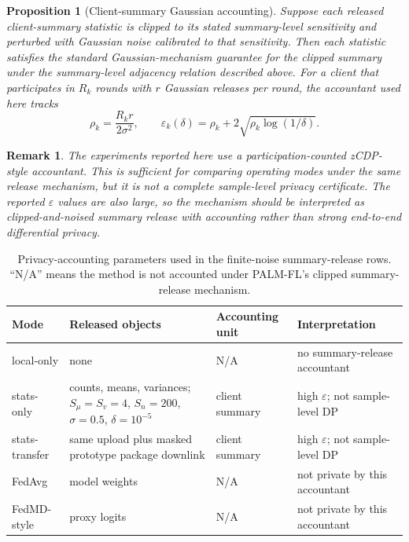 \documentclass[10pt,journal]{IEEEtran}
\newcommand{\localonly}{local-only}
\newcommand{\statsonly}{stats-only}
\newcommand{\statstransfer}{stats-transfer}
\newtheorem{proposition}{Proposition}
\newtheorem{remark}{Remark}
\begin{document}
\begin{proposition}[Client-summary Gaussian accounting]
Suppose each released client-summary statistic is clipped to its stated summary-level sensitivity and perturbed with Gaussian noise calibrated to that sensitivity. Then each statistic satisfies the standard Gaussian-mechanism guarantee for the clipped summary under the summary-level adjacency relation described above. For a client that participates in $R_k$ rounds with $r$ Gaussian releases per round, the accountant used here tracks
\begin{equation}
\rho_k = \frac{R_k r}{2\sigma^2},\qquad
\varepsilon_k(\delta)=\rho_k+2\sqrt{\rho_k\log(1/\delta)}.
\end{equation}
\end{proposition}

\begin{remark}
The experiments reported here use a participation-counted zCDP-style accountant. This is sufficient for comparing operating modes under the same release mechanism, but it is not a complete sample-level privacy certificate. The reported $\varepsilon$ values are also large, so the mechanism should be interpreted as clipped-and-noised summary release with accounting rather than strong end-to-end differential privacy.
\end{remark}

\begin{table}[t]
\centering
\caption{Privacy-accounting parameters used in the finite-noise summary-release rows. ``N/A'' means the method is not accounted under PALM-FL's clipped summary-release mechanism.}
\label{tab:privacy_accounting}
\scriptsize
\setlength{\tabcolsep}{3pt}
\begin{tabularx}{\columnwidth}{lXXl}
\toprule
Mode & Released objects & Accounting unit & Interpretation \\
\midrule
\localonly{} & none & N/A & no summary-release accountant \\
\statsonly{} & counts, means, variances; $S_{\mu}=S_v=4$, $S_n=200$, $\sigma=0.5$, $\delta=10^{-5}$ & client summary & high $\varepsilon$; not sample-level DP \\
\statstransfer{} & same upload plus masked prototype package downlink & client summary & high $\varepsilon$; not sample-level DP \\
FedAvg & model weights & N/A & not private by this accountant \\
FedMD-style & proxy logits & N/A & not private by this accountant \\
\bottomrule
\end{tabularx}
\end{table}
\end{document}
